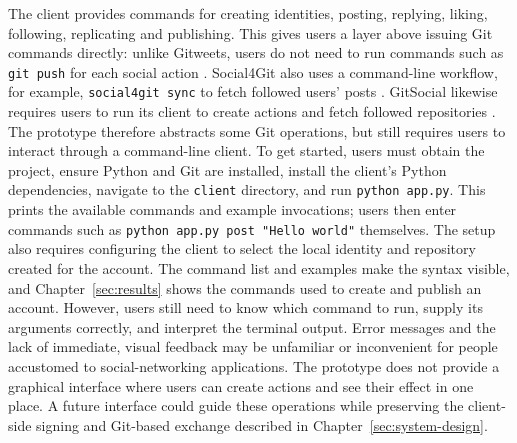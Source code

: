 The client provides commands for creating identities, posting, replying,
liking, following, replicating and publishing. This gives users a layer
above issuing Git commands directly: unlike Gitweets, users do not need to
run commands such as \texttt{git push} for each social action
\cite{gitweets2026}. Social4Git also uses a command-line workflow, for
example, \texttt{social4git sync} to fetch followed users' posts
\cite{social4git2026}. GitSocial likewise requires users to run its client
to create actions and fetch followed repositories \cite{gitsocial2026}.
The prototype therefore abstracts some Git operations, but still requires
users to interact through a command-line client. To get started, users must obtain the
project, ensure Python and Git are installed, install the client's Python
dependencies, navigate to the \texttt{client} directory, and run
\texttt{python app.py}. This prints the available commands and example
invocations; users then enter commands such as
\texttt{python app.py post "Hello world"} themselves. The setup also
requires configuring the client to select the local identity and repository
created for the account. The command list and examples make the syntax
visible, and Chapter~\ref{sec:results} shows
the commands used to create and publish an account. However, users still
need to know which command to run, supply its arguments correctly, and
interpret the terminal output. Error messages and the lack of immediate,
visual feedback may be unfamiliar or inconvenient for people accustomed to
social-networking applications. The prototype does not provide a graphical
interface where users can create actions and see their effect in one place.
A future interface could guide these operations while preserving the
client-side signing and Git-based exchange described in
Chapter~\ref{sec:system-design}.

